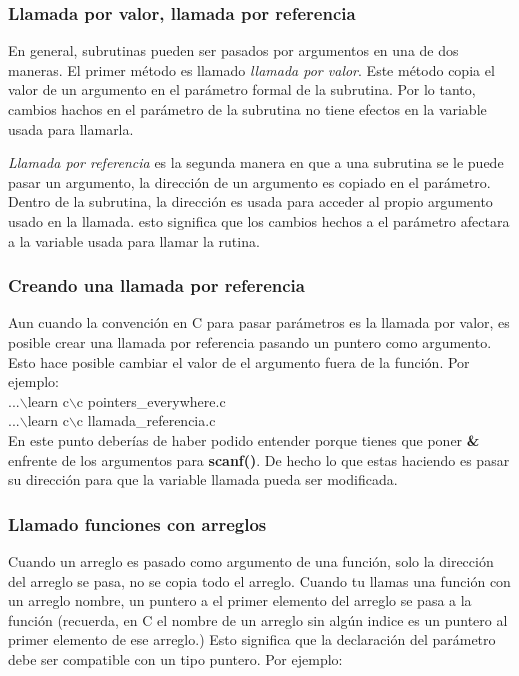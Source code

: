 \documentclass[]{article}
\begin{document}
	\subsubsection{Llamada por valor, llamada por referencia}
	
	En general, subrutinas pueden ser pasados por argumentos en una de dos maneras. El primer método es llamado \textit{llamada por valor}. Este método copia el valor de un argumento en el parámetro formal de la subrutina. Por lo tanto, cambios hachos en el parámetro de la subrutina no tiene efectos en la variable usada para llamarla.
	
	\textit{Llamada por referencia} es la segunda manera en que a una subrutina se le puede pasar un argumento, la dirección de un argumento es copiado en el parámetro. Dentro de la subrutina, la dirección es usada para acceder al propio argumento usado en la llamada. esto significa que los cambios hechos a el parámetro afectara a la variable usada para llamar la rutina.
	
	\subsubsection{Creando una llamada por referencia}
	
	Aun cuando la convención en C para pasar parámetros es la llamada por valor, es posible crear una llamada por referencia pasando un puntero como argumento. Esto hace posible cambiar el valor de el argumento fuera de la función. Por ejemplo:\\
	
	...$\backslash$learn c$\backslash$c pointers\_everywhere.c\\
	
	...$\backslash$learn c$\backslash$c llamada\_referencia.c\\
	
	En este punto deberías de haber podido entender porque tienes que poner \textbf{\&} enfrente de los argumentos para \textbf{scanf()}. De hecho lo que estas haciendo es pasar su dirección para que la variable llamada pueda ser modificada.\\
	
	\subsubsection{Llamado funciones con arreglos}
	
	Cuando un arreglo es pasado como argumento de una función, solo la dirección del arreglo se pasa, no se copia todo el arreglo. Cuando tu llamas una función con un arreglo nombre, un puntero a el primer elemento del arreglo se pasa a la función (recuerda, en C el nombre de un arreglo sin algún indice es un puntero al primer elemento de ese arreglo.) Esto significa que la declaración del parámetro debe ser compatible con un tipo puntero. Por ejemplo:\\
	
\end{document}

